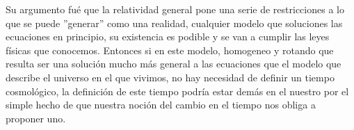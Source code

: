 \documentclass[11pt]{book}
\begin{document}



Su argumento fué que la relatividad general pone una serie de restricciones a lo que se puede ''generar'' como una realidad, cualquier modelo que soluciones las ecuaciones en principio, su existencia es podible y se van a cumplir las leyes físicas que conocemos. Entonces si en este modelo, homogeneo y rotando que resulta ser una solución mucho más general a las ecuaciones que el modelo que describe el universo en el que vivimos, no hay necesidad de definir un tiempo cosmológico, la definición de este tiempo podría estar demás en el nuestro por el simple hecho de que nuestra noción del cambio en el tiempo nos obliga a proponer uno.
\end{document}
